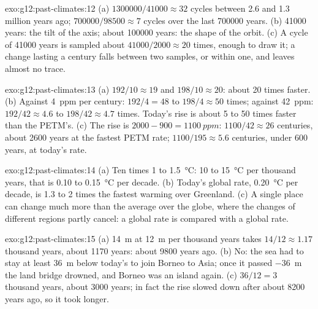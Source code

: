 \begin{solution}{exo:g12:past-climates:12}
(a) $\num{1300000}/\num{41000} \approx 32$ cycles between 2.6 and 1.3
million years ago; $\num{700000}/\num{98500} \approx 7$ cycles over the last
\num{700000} years. (b) \num{41000} years: the tilt of the axis; about
\num{100000} years: the shape of the orbit. (c) A cycle of \num{41000} years
is sampled about $\num{41000}/\num{2000} \approx 20$ times, enough to draw it;
a change lasting a century falls between two samples, or within one, and
leaves almost no trace.
\end{solution}

\begin{solution}{exo:g12:past-climates:13}
(a) $192/10 \approx 19$ and $198/10 \approx 20$: about 20 times faster.
(b) Against \qty{4}{ppm} per century: $192/4 = 48$ to $198/4 \approx 50$
times; against \qty{42}{ppm}: $192/42 \approx 4.6$ to $198/42 \approx 4.7$
times. Today's rise is about 5 to 50 times faster than the PETM's.
(c) The rise is $2000 - 900 = \qty{1100}{ppm}$: $1100/42 \approx 26$ centuries,
about \num{2600} years at the fastest PETM rate; $1100/195 \approx 5.6$
centuries, under 600 years, at today's rate.
\end{solution}

\begin{solution}{exo:g12:past-climates:14}
(a) Ten times 1 to \qty{1.5}{\degreeCelsius}: 10 to \qty{15}{\degreeCelsius}
per thousand years, that is 0.10 to \qty{0.15}{\degreeCelsius} per decade.
(b) Today's global rate, \qty{0.20}{\degreeCelsius} per decade, is 1.3 to 2
times the fastest warming over Greenland. (c) A single place can change much
more than the average over the globe, where the changes of different regions
partly cancel: a global rate is compared with a global rate.
\end{solution}

\begin{solution}{exo:g12:past-climates:15}
(a) \qty{14}{m} at \qty{12}{m} per thousand years takes $14/12 \approx
1.17$ thousand years, about \num{1170} years: about \num{9800} years ago.
(b) No: the sea had to stay at least \qty{36}{m} below today's to join
Borneo to Asia; once it passed \qty{-36}{m} the land bridge drowned, and
Borneo was an island again. (c) $36/12 = 3$ thousand years, about
\num{3000} years; in fact the rise slowed down after about \num{8200} years
ago, so it took longer.
\end{solution}

